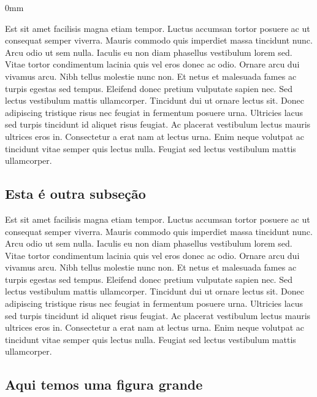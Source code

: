 \documentclass[./main.tex]{subfiles}
\begin{document}
\begin{adjustwidth}{\bodytab}{0mm}
\par Est sit amet facilisis magna etiam tempor. Luctus accumsan tortor posuere ac ut consequat semper viverra. Mauris commodo quis imperdiet massa tincidunt nunc. Arcu odio ut sem nulla. Iaculis eu non diam phasellus vestibulum lorem sed. Vitae tortor condimentum lacinia quis vel eros donec ac odio. Ornare arcu dui vivamus arcu. Nibh tellus molestie nunc non. Et netus et malesuada fames ac turpis egestas sed tempus. Eleifend donec pretium vulputate sapien nec. Sed lectus vestibulum mattis ullamcorper. Tincidunt dui ut ornare lectus sit. Donec adipiscing tristique risus nec feugiat in fermentum posuere urna. Ultricies lacus sed turpis tincidunt id aliquet risus feugiat. Ac placerat vestibulum lectus mauris ultrices eros in. Consectetur a erat nam at lectus urna. Enim neque volutpat ac tincidunt vitae semper quis lectus nulla. Feugiat sed lectus vestibulum mattis ullamcorper.

\subsection{Esta é outra subseção}  \label{chp2:sec1:sub2}

\par Est sit amet facilisis magna etiam tempor. Luctus accumsan tortor posuere ac ut consequat semper viverra. Mauris commodo quis imperdiet massa tincidunt nunc. Arcu odio ut sem nulla. Iaculis eu non diam phasellus vestibulum lorem sed. Vitae tortor condimentum lacinia quis vel eros donec ac odio. Ornare arcu dui vivamus arcu. Nibh tellus molestie nunc non. Et netus et malesuada fames ac turpis egestas sed tempus. Eleifend donec pretium vulputate sapien nec. Sed lectus vestibulum mattis ullamcorper. Tincidunt dui ut ornare lectus sit. Donec adipiscing tristique risus nec feugiat in fermentum posuere urna. Ultricies lacus sed turpis tincidunt id aliquet risus feugiat. Ac placerat vestibulum lectus mauris ultrices eros in. Consectetur a erat nam at lectus urna. Enim neque volutpat ac tincidunt vitae semper quis lectus nulla. Feugiat sed lectus vestibulum mattis ullamcorper.

\subsection{Aqui temos uma figura grande}  \label{chp2:sec1:sub3}


\end{adjustwidth}
\end{document}
